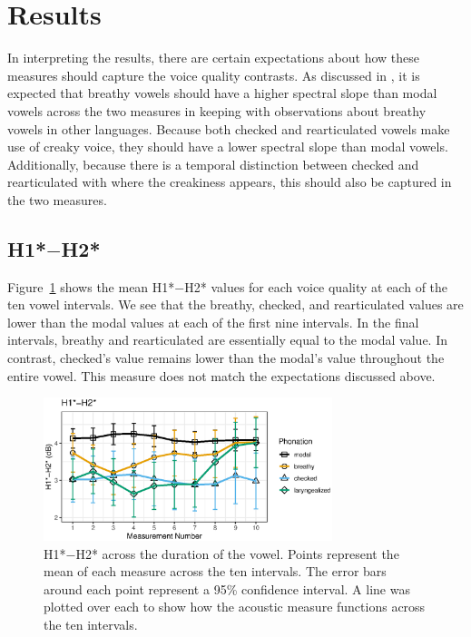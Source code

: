 \section{Results} \label{sec:Results}

In interpreting the results, there are certain expectations about how these measures should capture the voice quality contrasts. As discussed in \citet{garellekPhoneticsVoice2019}, it is expected that breathy vowels should have a higher spectral slope than modal vowels across the two measures in keeping with observations about breathy vowels in other languages. Because both checked and rearticulated vowels make use of creaky voice, they should have a lower spectral slope than modal vowels. Additionally, because there is a temporal distinction between checked and rearticulated with where the creakiness appears, this should also be captured in the two measures. 

\subsection{\texorpdfstring{H1*$-$H2*}{H1*-H2*}} \label{sec:H1H2}

Figure~\ref{fig:FIG1} shows the mean H1*$-$H2* values for each voice quality at each of the ten vowel intervals. We see that the breathy, checked, and rearticulated values are lower than the modal values at each of the first nine intervals. In the final intervals, breathy and rearticulated are essentially equal to the modal value. In contrast, checked's value remains lower than the modal's value throughout the entire vowel. This measure does not match the expectations discussed above.

\begin{figure}[htbp]
  \centering
  \includegraphics[width = 0.75\textwidth]{images/Figure1.eps}
  \caption{\label{fig:FIG1}{H1*$-$H2* across the duration of the vowel. Points represent the mean of each measure across the ten intervals. The error bars around each point represent a 95\% confidence interval. A line was plotted over each to show how the acoustic measure functions across the ten intervals.}}
\end{figure}

